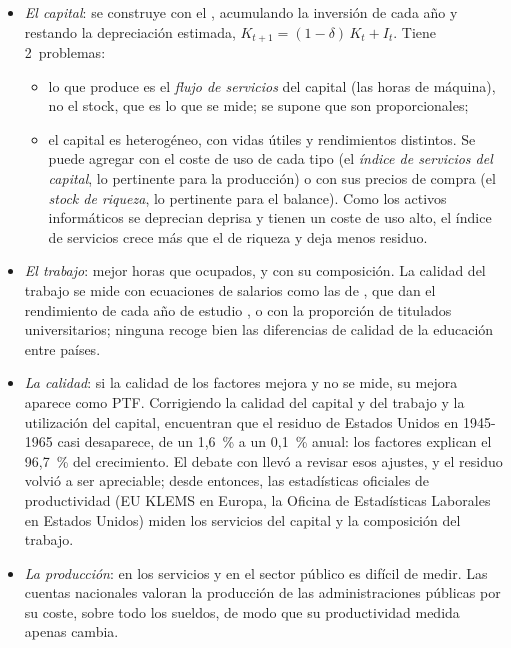 \documentclass[11pt]{article}
\begin{document}
\begin{itemize}
\item \emph{El capital}: se construye con el , acumulando la inversión de cada año y restando la depreciación estimada, $K_{t+1}=(1-\delta)\,K_t+I_t$. Tiene 2~problemas:
  \begin{itemize}
  \item lo que produce es el \emph{flujo de servicios} del capital (las horas de máquina), no el stock, que es lo que se mide; se supone que son proporcionales;
  \item el capital es heterogéneo, con vidas útiles y rendimientos distintos. Se puede agregar con el coste de uso de cada tipo (el \emph{índice de servicios del capital}, lo pertinente para la producción) o con sus precios de compra (el \emph{stock de riqueza}, lo pertinente para el balance)\nocite{OultonSrinivasan2003}. Como los activos informáticos se deprecian deprisa y tienen un coste de uso alto, el índice de servicios crece más que el de riqueza y deja menos residuo.
  \end{itemize}
\item \emph{El trabajo}: mejor horas que ocupados, y con su composición. La calidad del trabajo se mide con ecuaciones de salarios como las de \textcite{Mincer1974}, que dan el rendimiento de cada año de estudio , o con la proporción de titulados universitarios; ninguna recoge bien las diferencias de calidad de la educación entre países.
\item \emph{La calidad}: si la calidad de los factores mejora y no se mide, su mejora aparece como PTF. Corrigiendo la calidad del capital y del trabajo y la utilización del capital, \textcite{JorgensonGriliches1967} encuentran que el residuo de Estados Unidos en 1945-1965 casi desaparece, de un 1,6~\% a un 0,1~\% anual: los factores explican el 96,7~\% del crecimiento. El debate con  llevó a revisar esos ajustes, y el residuo volvió a ser apreciable; desde entonces, las estadísticas oficiales de productividad (EU KLEMS en Europa, la Oficina de Estadísticas Laborales en Estados Unidos) miden los servicios del capital y la composición del trabajo.
\item \emph{La producción}: en los servicios y en el sector público es difícil de medir. Las cuentas nacionales valoran la producción de las administraciones públicas por su coste, sobre todo los sueldos, de modo que su productividad medida apenas cambia.
\end{itemize}
\end{document}
